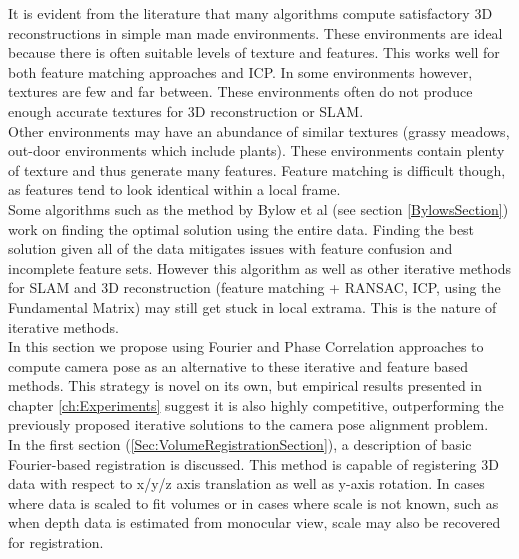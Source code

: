 
It is evident from the literature that many algorithms compute satisfactory 3D reconstructions in simple man made environments. These environments are ideal because there is often suitable levels of texture and features. This works well for both feature matching approaches and ICP. In some environments however, textures are few and far between. These environments often do not produce enough accurate textures for 3D reconstruction or SLAM. \\

Other environments may have an abundance of similar textures (grassy meadows, out-door environments which include plants). These environments contain plenty of texture and thus generate many features. Feature matching is difficult though, as features tend to look identical within a local frame. \\

Some algorithms such as the method by Bylow et al (see section \ref{BylowsSection}) work on finding the optimal solution using the entire data. Finding the best solution given all of the data mitigates issues with feature confusion and incomplete feature sets. However this algorithm as well as other iterative methods for SLAM and 3D reconstruction (feature matching + RANSAC, ICP, using the Fundamental Matrix) may still get stuck in local extrama. This is the nature of iterative methods. \\

In this section we propose using Fourier and Phase Correlation approaches to compute camera pose as an alternative to these iterative and feature based methods. This strategy is novel on its own, but empirical results presented in chapter \ref{ch:Experiments} suggest it is also highly competitive, outperforming the previously proposed iterative solutions to the camera pose alignment problem. \\

In the first section (\ref{Sec:VolumeRegistrationSection}), a description of basic Fourier-based registration is discussed. This method is capable of registering 3D data with respect to x/y/z axis translation as well as y-axis rotation. In cases where data is scaled to fit volumes or in cases where scale is not known, such as when depth data is estimated from monocular view, scale may also be recovered for registration. \\

